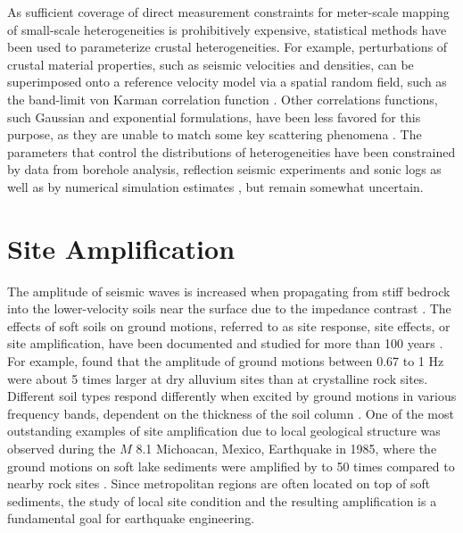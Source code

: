 As sufficient coverage of direct measurement constraints for meter-scale mapping of small-scale heterogeneities is prohibitively expensive, statistical methods have been used to parameterize crustal heterogeneities. For example, perturbations of crustal material properties, such as seismic velocities and densities, can be superimposed onto a reference velocity model via a spatial random field, such as the band-limit von Karman correlation function \citep[][\cref{app:A}]{frankelFiniteDifferenceSimulations1986,hartzellEffects3DRandom2010}. Other correlations functions, such Gaussian and exponential formulations, have been less favored for this purpose, as they are unable to match some key scattering phenomena \citep{frankelFiniteDifferenceSimulations1986}. The parameters that control the distributions of heterogeneities have been constrained by data from borehole analysis, reflection seismic experiments and sonic logs     as well as by numerical simulation estimates \citep{thyboSeismicScatteringTop2003,nielsenIdentificationCrustalUpper2006, przybillaEstimationCrustalScattering2009, imperatoriBroadbandNearfieldGround2013, imperatoriRoleTopographyLateral2015}, but remain somewhat uncertain.


\section{Site Amplification}

The amplitude of seismic waves is increased when propagating from stiff bedrock into the lower-velocity soils near the surface due to the impedance contrast \citep{booreShortperiodSwaveRadiation1986,silvaEngineeringCharacterizationStrong1995}. The effects of soft soils on ground motions, referred to as site response, site effects, or site amplification, have been documented and studied for more than 100 years . For example, \citet{gutenbergEffectsGroundEarthquake1957} found that the amplitude of ground motions between 0.67 to 1 Hz were about 5 times larger at dry alluvium sites than at crystalline rock sites.  Different soil types respond differently when excited by ground motions in various frequency bands, dependent on the thickness of the soil column \citep{akiLocalSiteEffects1993}. One of the most outstanding examples of site amplification due to local geological structure was observed during the $M$ 8.1 Michoacan, Mexico, Earthquake in 1985, where the ground motions on soft lake sediments were amplified by to 50 times compared to nearby rock sites \citep{singh1993origin}. Since metropolitan regions are often located on top of soft sediments, the study of local site condition and the resulting amplification is a fundamental goal for earthquake engineering.

